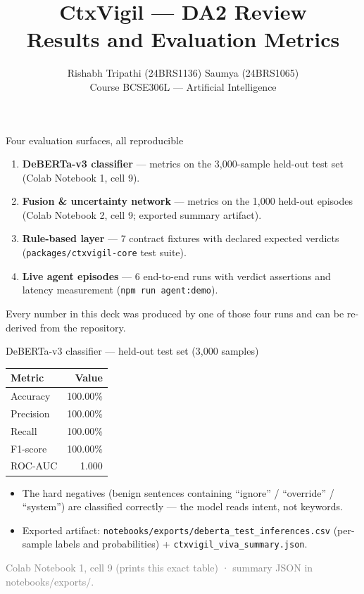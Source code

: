 \documentclass[aspectratio=169]{beamer}
\title{CtxVigil --- DA2 Review\\Results and Evaluation Metrics}
\author{Rishabh Tripathi (24BRS1136) \quad Saumya (24BRS1065)\\ \footnotesize Course BCSE306L --- Artificial Intelligence}
\date{}
\newcommand{\src}[1]{{\footnotesize\textcolor{gray}{#1}}}
\begin{document}
\begin{frame}
\titlepage
\end{frame}

\begin{frame}{Four evaluation surfaces, all reproducible}
\begin{enumerate}
  \item \textbf{DeBERTa-v3 classifier} --- metrics on the 3{,}000-sample held-out test set (Colab Notebook 1, cell 9).
  \item \textbf{Fusion \& uncertainty network} --- metrics on the 1{,}000 held-out episodes (Colab Notebook 2, cell 9; exported summary artifact).
  \item \textbf{Rule-based layer} --- 7 contract fixtures with declared expected verdicts (\texttt{packages/ctxvigil-core} test suite).
  \item \textbf{Live agent episodes} --- 6 end-to-end runs with verdict assertions and latency measurement (\texttt{npm run agent:demo}).
\end{enumerate}
Every number in this deck was produced by one of those four runs and can be re-derived from the repository.
\end{frame}

\begin{frame}{DeBERTa-v3 classifier --- held-out test set (3{,}000 samples)}
\begin{center}
\begin{tabular}{@{}lr@{}}
\toprule
\textbf{Metric} & \textbf{Value} \\
\midrule
Accuracy & 100.00\% \\
Precision & 100.00\% \\
Recall & 100.00\% \\
F1-score & 100.00\% \\
ROC-AUC & 1.000 \\
\bottomrule
\end{tabular}
\end{center}
\begin{itemize}
  \item The hard negatives (benign sentences containing ``ignore'' / ``override'' / ``system'') are classified correctly --- the model reads intent, not keywords.
  \item Exported artifact: \texttt{notebooks/exports/deberta\_test\_inferences.csv} (per-sample labels and probabilities) + \texttt{ctxvigil\_viva\_summary.json}.
\end{itemize}
\src{Colab Notebook 1, cell 9 (prints this exact table) · summary JSON in notebooks/exports/.}
\end{frame}
\end{document}
